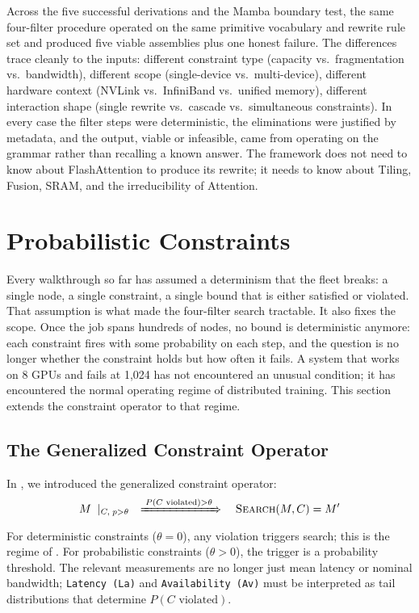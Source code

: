 \documentclass[10pt,twocolumn]{article}
\begin{document}
Across the five successful derivations and the Mamba boundary test, the same four-filter procedure operated on the same primitive vocabulary and rewrite rule set and produced five viable assemblies plus one honest failure. The differences trace cleanly to the inputs: different constraint type (capacity vs.\ fragmentation vs.\ bandwidth), different scope (single-device vs.\ multi-device), different hardware context (NVLink vs.\ InfiniBand vs.\ unified memory), different interaction shape (single rewrite vs.\ cascade vs.\ simultaneous constraints). In every case the filter steps were deterministic, the eliminations were justified by metadata, and the output, viable or infeasible, came from operating on the grammar rather than recalling a known answer. The framework does not need to know about FlashAttention to produce its rewrite; it needs to know about Tiling, Fusion, SRAM, and the irreducibility of Attention.

\section{Probabilistic Constraints}
\label{sec:probabilistic}

Every walkthrough so far has assumed a determinism that the fleet breaks: a single node, a single constraint, a single bound that is either satisfied or violated. That assumption is what made the four-filter search tractable. It also fixes the scope. Once the job spans hundreds of nodes, no bound is deterministic anymore: each constraint fires with some probability on each step, and the question is no longer whether the constraint holds but how often it fails. A system that works on 8 GPUs and fails at 1{,}024 has not encountered an unusual condition; it has encountered the normal operating regime of distributed training. This section extends the constraint operator to that regime.

\subsection{The Generalized Constraint Operator}

In , we introduced the generalized constraint operator:
\begin{equation}
M \;\mid_{C,\; p > \theta} \quad \xRightarrow{\;P(C\text{ violated}) > \theta\;} \quad \text{\textsc{Search}}(M, C) = M'
\end{equation}
For deterministic constraints ($\theta = 0$), any violation triggers search; this is the regime of . For probabilistic constraints ($\theta > 0$), the trigger is a probability threshold. The relevant measurements are no longer just mean latency or nominal bandwidth; \texttt{Latency (La)} and \texttt{Availability (Av)} must be interpreted as tail distributions that determine $P(C\text{ violated})$.
\end{document}
